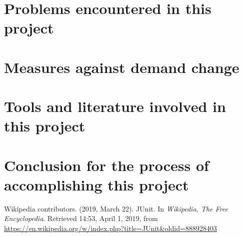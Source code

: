 \documentclass[a4paper]{report}
\begin{document}
\chapter{Problems encountered in this project}


\chapter{Measures against demand change}



\chapter{Tools and literature involved in this project}



\chapter{Conclusion for the process of accomplishing this project}


\begin{thebibliography}{A}


Wikipedia contributors. (2019, March 22). JUnit. In \emph{Wikipedia, The Free Encyclopedia}. Retrieved 14:53, April 1, 2019, from \url{https://en.wikipedia.org/w/index.php?title=JUnit&oldid=888928403}

\end{thebibliography}
\end{document}
